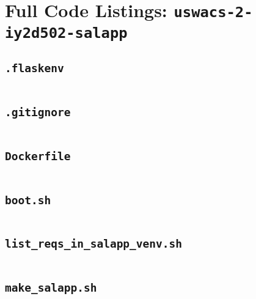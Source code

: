 \section{Full Code Listings: \texttt{uswacs-2-iy2d502-salapp}}
\subsection{\texttt{.flaskenv}}
\begin{codelisting}
\label{fcl:uswacs-2-iy2d502-salapp:.flaskenv}
\inputminted[breakanywhere]{text}{../uswacs-2-iy2d502-salapp/.flaskenv}\end{codelisting}
\subsection{\texttt{.gitignore}}
\begin{codelisting}
\label{fcl:uswacs-2-iy2d502-salapp:.gitignore}
\inputminted[breakanywhere]{text}{../uswacs-2-iy2d502-salapp/.gitignore}\end{codelisting}
\subsection{\texttt{Dockerfile}}
\begin{codelisting}
\label{fcl:uswacs-2-iy2d502-salapp:Dockerfile}
\inputminted[breakanywhere]{text}{../uswacs-2-iy2d502-salapp/Dockerfile}\end{codelisting}
\subsection{\texttt{boot.sh}}
\begin{codelisting}
\label{fcl:uswacs-2-iy2d502-salapp:boot.sh}
\inputminted[breakanywhere]{bash}{../uswacs-2-iy2d502-salapp/boot.sh}\end{codelisting}
\subsection{\texttt{list\_reqs\_in\_salapp\_venv.sh}}
\begin{codelisting}
\label{fcl:uswacs-2-iy2d502-salapp:list_reqs_in_salapp_venv.sh}
\inputminted[breakanywhere]{bash}{../uswacs-2-iy2d502-salapp/list_reqs_in_salapp_venv.sh}\end{codelisting}
\subsection{\texttt{make\_salapp.sh}}
\begin{codelisting}
\label{fcl:uswacs-2-iy2d502-salapp:make_salapp.sh}
\inputminted[breakanywhere]{bash}{../uswacs-2-iy2d502-salapp/make_salapp.sh}\end{codelisting}
